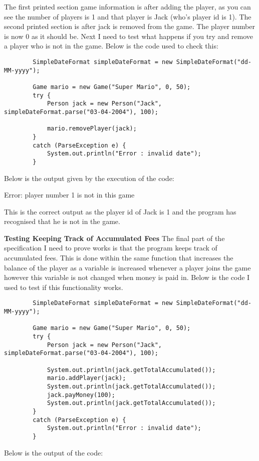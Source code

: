 \documentclass[a4paper]{article}
\begin{document}
The first printed section game information is after adding the player, as you can see the number of players is 1 and that player is Jack (who's player id is 1). The second printed section is after jack is removed from the game. The player number is now 0 as it should be. Next I need to test what happens if you try and remove a player who is not in the game. Below is the code used to check this: \begin{lstlisting}
		SimpleDateFormat simpleDateFormat = new SimpleDateFormat("dd-MM-yyyy");

        Game mario = new Game("Super Mario", 0, 50);
        try {
            Person jack = new Person("Jack", simpleDateFormat.parse("03-04-2004"), 100);

            mario.removePlayer(jack);
        }
        catch (ParseException e) {
            System.out.println("Error : invalid date");
        }
\end{lstlisting}
Below is the output given by the execution of the code: \newline

\noindent Error: player number 1 is not in this game \newline

This is the correct output as the player id of Jack is 1 and the program has recognised that he is not in the game.\newline

\noindent \textbf{Testing Keeping Track of Accumulated Fees}
The final part of the specification I need to prove works is that the program keeps track of accumulated fees. This is done within the same function that increases the balance of the player as a variable is increased whenever a player joins the game however this variable is not changed when money is paid in. Below is the code I used to test if this functionality works. \begin{lstlisting}
		SimpleDateFormat simpleDateFormat = new SimpleDateFormat("dd-MM-yyyy");

        Game mario = new Game("Super Mario", 0, 50);
        try {
            Person jack = new Person("Jack", simpleDateFormat.parse("03-04-2004"), 100);

			System.out.println(jack.getTotalAccumulated());
            mario.addPlayer(jack);
            System.out.println(jack.getTotalAccumulated());
            jack.payMoney(100);
            System.out.println(jack.getTotalAccumulated());
        }
        catch (ParseException e) {
            System.out.println("Error : invalid date");
        }
\end{lstlisting}
Below is the output of the code: \newline
\end{document}
